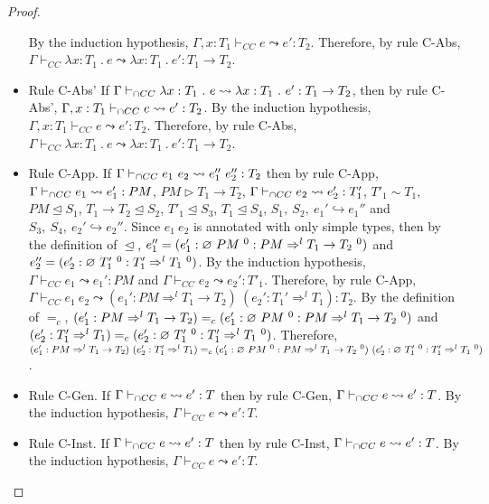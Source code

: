 \documentclass[a4paper]{article}
\begin{document}
\begin{proof}
\begin{itemize}
    By the induction hypothesis, $\Gamma, x : T_1 \vdash_{CC} e \leadsto e' : T_2$.
    Therefore, by rule C-Abs, $\Gamma \vdash_{CC} \lambda x : T_1\ .\ e \leadsto \lambda x : T_1\ .\ e' : T_1 \rightarrow T_2$.
    \item Rule C-Abs'
    If $\Gamma \vdash_{\cap CC} \lambda x : T_1\ .\ e \leadsto \lambda x : T_1\ .\ e' : T_1 \rightarrow T_2$, then by rule C-Abs', $\Gamma, x : T_1 \vdash_{\cap CC} e \leadsto e' : T_2$.
    By the induction hypothesis, $\Gamma, x : T_1 \vdash_{CC} e \leadsto e' : T_2$.
    Therefore, by rule C-Abs, $\Gamma \vdash_{CC} \lambda x : T_1\ .\ e \leadsto \lambda x : T_1\ .\ e' : T_1 \rightarrow T_2$.
    \item Rule C-App.
    If $\Gamma \vdash_{\cap CC} e_1\ e_2 \leadsto e_1''\ e_2'' : T_2$ then by rule C-App, $\Gamma \vdash_{\cap CC} e_1 \leadsto e_1' : PM$, $PM \rhd T_1 \rightarrow T_2$, $\Gamma \vdash_{\cap CC} e_2 \leadsto e_2' : T'_1$, $T'_1 \sim T_1$, $PM \trianglelefteq S_1$, $T_1 \rightarrow T_2 \trianglelefteq S_2$, $T'_1 \trianglelefteq S_3$, $T_1 \trianglelefteq S_4$, $S_1,\ S_2,\ e_1' \hookrightarrow e_1''$ and $S_3,\ S_4,\ e_2' \hookrightarrow e_2''$.
    Since $e_1\ e_2$ is annotated with only simple types, then by the definition of $\trianglelefteq$, $e_1'' = (e_1' : \varnothing\ PM\ ^{0} : PM \Rightarrow^l T_1 \rightarrow T_2\ ^0)$ and $e_2'' = (e_2' : \varnothing\ T_1'\ ^{0} : T_1' \Rightarrow^l T_1\ ^0)$.
    By the induction hypothesis, $\Gamma \vdash_{CC} e_1 \leadsto e_1' : PM$ and $\Gamma \vdash_{CC} e_2 \leadsto e_2' : T'_1$.
    Therefore, by rule C-App, $\Gamma \vdash_{CC} e_1\ e_2 \leadsto (e_1' : PM \Rightarrow^l T_1 \rightarrow T_2)\ (e_2' : T_1' \Rightarrow^l T_1) : T_2$.
    By the definition of $=_c$, $(e_1' : PM \Rightarrow^l T_1 \rightarrow T_2) =_c (e_1' : \emptycast{PM}{0} : PM \Rightarrow^l T_1 \rightarrow T_2\ ^0)$ and $(e_2' : T_1' \Rightarrow^l T_1) =_c (e_2' : \emptycast{T_1'}{0} : T_1' \Rightarrow^l T_1\ ^0)$.
    Therefore, $(e_1' : PM \Rightarrow^l T_1 \rightarrow T_2)\ (e_2' : T_1' \Rightarrow^l T_1) =_c (e_1' : \emptycast{PM}{0} : PM \Rightarrow^l T_1 \rightarrow T_2\ ^0)\ (e_2' : \emptycast{T_1'}{0} : T_1' \Rightarrow^l T_1\ ^0)$.
    \item Rule C-Gen.
    If $\Gamma \vdash_{\cap CC} e \leadsto e' : T$ then by rule C-Gen, $\Gamma \vdash_{\cap CC} e \leadsto e' : T$.
    By the induction hypothesis, $\Gamma \vdash_{CC} e \leadsto e' : T$.
    \item Rule C-Inst.
    If $\Gamma \vdash_{\cap CC} e \leadsto e' : T$ then by rule C-Inst, $\Gamma \vdash_{\cap CC} e \leadsto e' : T$.
    By the induction hypothesis, $\Gamma \vdash_{CC} e \leadsto e' : T$.
\end{itemize}
\end{proof}
\end{document}
